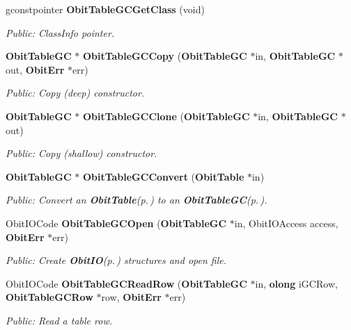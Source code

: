 \begin{CompactItemize}
gconstpointer {\bf Obit\-Table\-GCGet\-Class} (void)
\begin{CompactList}\small\item\em Public: Class\-Info pointer. \item\end{CompactList}\item 
{\bf Obit\-Table\-GC} $\ast$ {\bf Obit\-Table\-GCCopy} ({\bf Obit\-Table\-GC} $\ast$in, {\bf Obit\-Table\-GC} $\ast$out, {\bf Obit\-Err} $\ast$err)
\begin{CompactList}\small\item\em Public: Copy (deep) constructor. \item\end{CompactList}\item 
{\bf Obit\-Table\-GC} $\ast$ {\bf Obit\-Table\-GCClone} ({\bf Obit\-Table\-GC} $\ast$in, {\bf Obit\-Table\-GC} $\ast$out)
\begin{CompactList}\small\item\em Public: Copy (shallow) constructor. \item\end{CompactList}\item 
{\bf Obit\-Table\-GC} $\ast$ {\bf Obit\-Table\-GCConvert} ({\bf Obit\-Table} $\ast$in)
\begin{CompactList}\small\item\em Public: Convert an {\bf Obit\-Table}{\rm (p.\,\pageref{structObitTable})} to an {\bf Obit\-Table\-GC}{\rm (p.\,\pageref{structObitTableGC})}. \item\end{CompactList}\item 
Obit\-IOCode {\bf Obit\-Table\-GCOpen} ({\bf Obit\-Table\-GC} $\ast$in, Obit\-IOAccess access, {\bf Obit\-Err} $\ast$err)
\begin{CompactList}\small\item\em Public: Create {\bf Obit\-IO}{\rm (p.\,\pageref{structObitIO})} structures and open file. \item\end{CompactList}\item 
Obit\-IOCode {\bf Obit\-Table\-GCRead\-Row} ({\bf Obit\-Table\-GC} $\ast$in, {\bf olong} i\-GCRow, {\bf Obit\-Table\-GCRow} $\ast$row, {\bf Obit\-Err} $\ast$err)
\begin{CompactList}\small\item\em Public: Read a table row. \item\end{CompactList}\item 

\end{CompactItemize}
